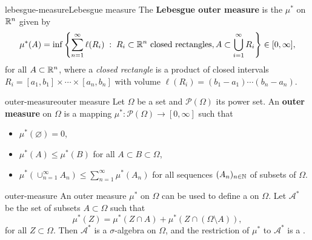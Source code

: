 \begin{topic}{lebesgue-measure}{Lebesgue measure}
    The \textbf{Lebesgue outer measure} is the  $\mu^*$ on $\mathbb{R}^n$ given by
    \[ \mu^*(A) = \inf \left\{ \sum_{n = 1}^{\infty} \ell(R_i) \;:\; R_i \subset \mathbb{R}^n \textup{ closed rectangles}, A \subset \bigcup_{i = 1}^{\infty} R_i \right\} \in [0, \infty] , \]
    for all $A \subset \mathbb{R}^n$, where a \textit{closed rectangle} is a product of closed intervals $R_i = [a_1, b_1] \times \cdots \times [a_n, b_n]$ with volume $\ell(R_i) =  (b_1 - a_1) \cdots (b_n - a_n)$.
\end{topic}

\begin{topic}{outer-measure}{outer measure}
    Let $\Omega$ be a set and $\mathcal{P}(\Omega)$ its power set. An \textbf{outer measure} on $\Omega$ is a mapping $\mu^* : \mathcal{P}(\Omega) \to [0, \infty]$ such that
    \begin{itemize}
        \item $\mu^*(\varnothing) = 0$,
        \item $\mu^*(A) \le \mu^*(B)$ for all $A \subset B \subset \Omega$,
        \item $\mu^*\left(\cup_{n = 1}^{\infty} A_n \right) \le \sum_{n = 1}^{\infty} \mu^*(A_n)$ for all sequences $(A_n)_{n \in \mathbb{N}}$ of subsets of $\Omega$.
    \end{itemize}
\end{topic}

\begin{example}{outer-measure}
    An outer measure $\mu^*$ on $\Omega$ can be used to define a  on $\Omega$. Let $\mathcal{A}^*$ be the set of subsets $A \subset \Omega$ such that
    \[ \mu^*(Z) = \mu^*(Z \cap A) + \mu^*(Z \cap (\Omega \setminus A)) , \]
    for all $Z \subset \Omega$. Then $\mathcal{A}^*$ is a $\sigma$-algebra on $\Omega$, and the restriction of $\mu^*$ to $\mathcal{A}^*$ is a .
\end{example}
